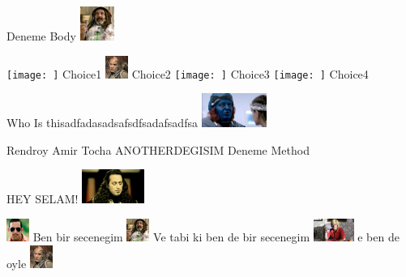\documentclass{exam}
\begin{document}
\begin{questions}
\question Deneme Body\newline
\includegraphics[height=3em]{faruk.jpg} \newline
\begin{oneparchoices}
\choice \texttt{[image: ]}
Choice1
\choice \includegraphics[height=2em]{216.jpg}
Choice2
\choice \texttt{[image: ]}
Choice3
\choice \texttt{[image: ]}
Choice4
\end{oneparchoices}
\question Who Is thisadfadasadsafsdfsadafsadfsa\newline
\includegraphics[height=3em]{rendroy2.jpg} \newline
\begin{oneparchoices}
\choice Rendroy
\choice Amir Tocha
\choice ANOTHERDEGISIM
\choice Deneme Method
\end{oneparchoices}
\question HEY SELAM!\newline
\includegraphics[height=3em]{komutanlogar.jpeg} \newline
\begin{oneparchoices}
\choice \includegraphics[height=2em]{arifisik.jpg}
Ben bir secenegim
\choice \includegraphics[height=2em]{faruk.jpg}
Ve tabi ki ben de bir secenegim
\choice \includegraphics[height=2em]{ersan.jpg}
e ben de oyle
\choice \includegraphics[height=2em]{216.jpg}

\end{oneparchoices}
\end{questions}
\end{document}

